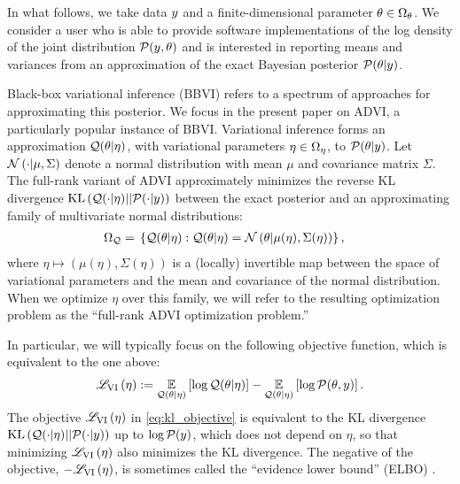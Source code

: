 In what follows, we take data $y$ and a finite-dimensional parameter $\theta
\in \Omega_{\theta}$. We consider a user who is able to provide software
implementations of the log density of the joint distribution $\mathcal{P}(y, \theta)$
and is interested in reporting means and variances from an approximation of the
exact Bayesian posterior $\mathcal{P}(\theta \vert y)$.

Black-box variational inference (BBVI) refers to a spectrum of approaches for
approximating this posterior. We focus in the present paper on ADVI, a
particularly popular instance of BBVI. Variational inference forms an
approximation $\mathcal{Q}(\theta \vert \eta)$, with variational parameters $\eta \in
\Omega_{\eta}$, to $\mathcal{P}(\theta \vert y)$. Let $\mathcal{N}\left(\cdot \vert \mu, \Sigma\right)$ denote a
normal distribution with mean $\mu$ and covariance matrix $\Sigma$. The
full-rank variant of ADVI approximately minimizes the reverse KL divergence
$\textrm{KL}\left( \mathcal{Q}(\cdot \vert \eta) || \mathcal{P}(\cdot \vert y)\right)$ between
the exact posterior and an approximating family of multivariate normal
distributions:
%
\begin{align}\label{eq:advi_qdom}
%
\qdom ={}& \left\{
    \q(\theta \vert \eta):
    \q(\theta \vert \eta) =
        \normal{\theta}{\mu(\eta), \Sigma(\eta)} \right\},
%
\end{align}
%
where $\eta \mapsto (\mu(\eta), \Sigma(\eta))$ is a (locally) invertible map
between the space of variational parameters and the mean and covariance of the
normal distribution. When we optimize $\eta$ over this family, we will refer to
the resulting optimization problem as the ``full-rank ADVI optimization
problem.''

In particular, we will typically focus on the following objective function,
which is equivalent to the one above:
%
\begin{align}\label{eq:kl_objective}
%
\klfullobj{\eta} :=
        \expect{\q(\theta \vert \eta)}{\log \q(\theta \vert \eta)}
        -\expect{\q(\theta \vert \eta)}{\logjoint}.
%
\end{align}
%
The objective $\mathscr{L}_{\mathrm{VI}}\left(\eta\right)$ in \cref{eq:kl_objective} is equivalent to the
KL divergence $\textrm{KL}\left( \mathcal{Q}(\cdot \vert \eta) || \mathcal{P}(\cdot \vert
y)\right)$ up to $\log \mathcal{P}(y)$, which does not depend on $\eta$, so that
minimizing $\mathscr{L}_{\mathrm{VI}}\left(\eta\right)$ also minimizes the KL divergence. The negative of
the objective, $-\mathscr{L}_{\mathrm{VI}}\left(\eta\right)$, is sometimes called the ``evidence lower
bound'' (ELBO) \citep{blei:2016:variational}. 

